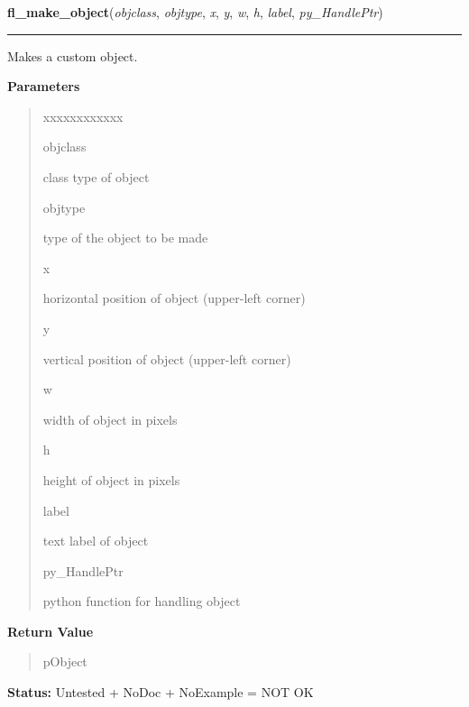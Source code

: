 \hspace{.8\funcindent}\begin{boxedminipage}{\funcwidth}

    \raggedright \textbf{fl\_make\_object}(\textit{objclass}, \textit{objtype}, \textit{x}, \textit{y}, \textit{w}, \textit{h}, \textit{label}, \textit{py\_HandlePtr})

    \vspace{-1.5ex}

    \rule{\textwidth}{0.5\fboxrule}
\setlength{\parskip}{2ex}
    Makes a custom object.

\setlength{\parskip}{1ex}
      \textbf{Parameters}
      \vspace{-1ex}

      \begin{quote}
        \begin{Ventry}{xxxxxxxxxxxx}

          \item[objclass]

          class type of object

          \item[objtype]

          type of the object to be made

          \item[x]

          horizontal position of object (upper-left corner)

          \item[y]

          vertical position of object (upper-left corner)

          \item[w]

          width of object in pixels

          \item[h]

          height of object in pixels

          \item[label]

          text label of object

          \item[py\_HandlePtr]

          python function for handling object

        \end{Ventry}

      \end{quote}

      \textbf{Return Value}
    \vspace{-1ex}

      \begin{quote}
      pObject

      \end{quote}

\textbf{Status:} Untested + NoDoc + NoExample = NOT OK



    \end{boxedminipage}

